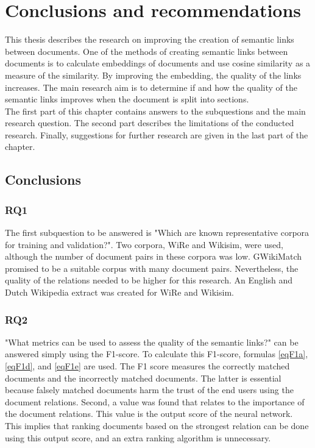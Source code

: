\pagebreak
\chapter{Conclusions and recommendations}
\label{secConclusions}


This thesis describes the research on improving the creation of semantic links between documents. One of the methods of creating semantic links between documents is to calculate embeddings of documents and use cosine similarity as a measure of the similarity. By improving the embedding, the quality of the links increases. The main research aim is to determine if and how the quality of the semantic links improves when the document is split into sections. \\

The first part of this chapter contains answers to the subquestions and the main research question. The second part describes the limitations of the conducted research. Finally, suggestions for further research are given in the last part of the chapter. 

\section{Conclusions}

\subsection{RQ1}
The first subquestion to be answered is "Which are known representative corpora for training and validation?". Two corpora, WiRe and Wikisim, were used, although the number of document pairs in these corpora was low. GWikiMatch promised to be a suitable corpus with many document pairs. Nevertheless, the quality of the relations needed to be higher for this research. An English and Dutch Wikipedia extract was created for WiRe and Wikisim.

\subsection{RQ2}
"What metrics can be used to assess the quality of the semantic links?" can be answered simply using the F1-score. To calculate this F1-score, formulas \ref{eqF1a}, \ref{eqF1d}, and \ref{eqF1e} are used. The F1 score measures the correctly matched documents and the incorrectly matched documents. The latter is essential because falsely matched documents harm the trust of the end users using the document relations. Second, a value was found that relates to the importance of the document relations. This value is the output score of the neural network. This implies that ranking documents based on the strongest relation can be done using this output score, and an extra ranking algorithm is unnecessary.

